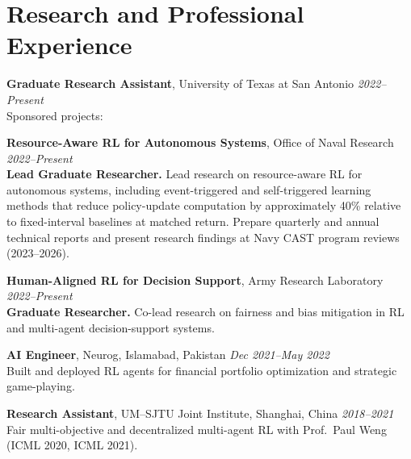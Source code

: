 \documentclass[letterpaper,11pt]{article}
\begin{document}
\section*{Research and Professional Experience}
\textbf{Graduate Research Assistant}, University of Texas at San Antonio \hfill \textit{2022--Present} \\
Sponsored projects:
\begin{cvlist}
    \item \textbf{Resource-Aware RL for Autonomous Systems}, Office of Naval Research \hfill \textit{2022--Present} \\
    \textbf{Lead Graduate Researcher.} Lead research on resource-aware RL for autonomous systems, including event-triggered and self-triggered learning methods that reduce policy-update computation by approximately 40\% relative to fixed-interval baselines at matched return. Prepare quarterly and annual technical reports and present research findings at Navy CAST program reviews (2023--2026).
    \item \textbf{Human-Aligned RL for Decision Support}, Army Research Laboratory \hfill \textit{2022--Present} \\
    \textbf{Graduate Researcher.} Co-lead research on fairness and bias mitigation in RL and multi-agent decision-support systems.
\end{cvlist}

\textbf{AI Engineer}, Neurog, Islamabad, Pakistan \hfill \textit{Dec 2021--May 2022} \\
Built and deployed RL agents for financial portfolio optimization and strategic game-playing.

\textbf{Research Assistant}, UM--SJTU Joint Institute, Shanghai, China \hfill \textit{2018--2021} \\
Fair multi-objective and decentralized multi-agent RL with Prof.\ Paul Weng (ICML 2020, ICML 2021).

\end{document}
